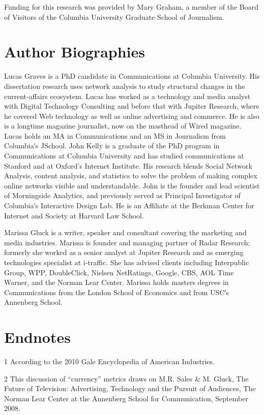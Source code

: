 Funding for this research was provided by Mary Graham, a member of
the Board of Visitors of the Columbia University Graduate School of
Journalism.

\chapter{Author Biographies}
Lucas Graves is a PhD candidate in Communications at Columbia
University. His dissertation research uses network analysis to study
structural changes in the current‐affairs ecosystem. Lucas has worked as a
technology and media analyst with Digital Technology Consulting and
before that with Jupiter Research, where he covered Web technology as
well as online advertising and commerce. He is also is a longtime
magazine journalist, now on the masthead of Wired magazine. Lucas holds
an MA in Communications and an MS in Journalism from Columbiaʹs JSchool.
John Kelly is a graduate of the PhD program in Communications at
Columbia University and has studied communications at Stanford and at
Oxford’s Internet Institute. His research blends Social Network Analysis,
content analysis, and statistics to solve the problem of making complex
online networks visible and understandable. John is the founder and lead
scientist of Morningside Analytics, and previously served as Principal
Investigator of Columbiaʹs Interactive Design Lab. He is an Affiliate at the
Berkman Center for Internet and Society at Harvard Law School.

Marissa Gluck is a writer, speaker and consultant covering the marketing
and media industries. Marissa is founder and managing partner of Radar
Research; formerly she worked as a senior analyst at Jupiter Research and
as emerging technologies specialist at i‐traffic. She has advised clients
including Interpublic Group, WPP, DoubleClick, Nielsen NetRatings,
Google, CBS, AOL Time Warner, and the Norman Lear Center. Marissa
holds masters degrees in Communications from the London School of
Economics and from USCʹs Annenberg School.

\chapter{Endnotes}

1 According to the 2010 Gale Encyclopedia of American Industries.

2 This discussion of ``currency'' metrics draws on M.R. Sales & M. Gluck, The Future
of Television: Advertising, Technology and the Pursuit of Audiences, The Norman
Lear Center at the Annenberg School for Communication, September 2008.

